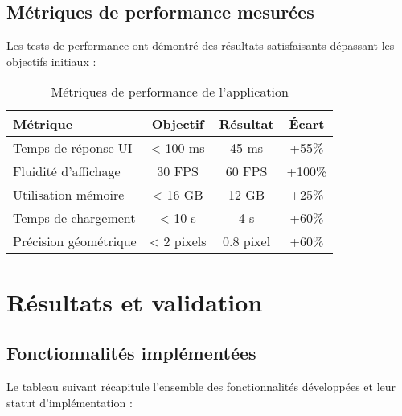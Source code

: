 \documentclass[12pt,a4paper]{report}
\begin{document}
\subsection{Métriques de performance mesurées}

Les tests de performance ont démontré des résultats satisfaisants dépassant les objectifs initiaux :

\begin{table}[H]
\centering
\caption{Métriques de performance de l'application}
\label{tab:performances}
\begin{tabular}{|l|c|c|c|}
\hline
\textbf{Métrique} & \textbf{Objectif} & \textbf{Résultat} & \textbf{Écart} \\
\hline
Temps de réponse UI & < 100 ms & 45 ms & +55\% \\
Fluidité d'affichage & 30 FPS & 60 FPS & +100\% \\
Utilisation mémoire & < 16 GB & 12 GB & +25\% \\
Temps de chargement & < 10 s & 4 s & +60\% \\
Précision géométrique & < 2 pixels & 0.8 pixel & +60\% \\
\hline
\end{tabular}
\end{table}

\section{Résultats et validation}

\subsection{Fonctionnalités implémentées}

Le tableau suivant récapitule l'ensemble des fonctionnalités développées et leur statut d'implémentation :
\end{document}
